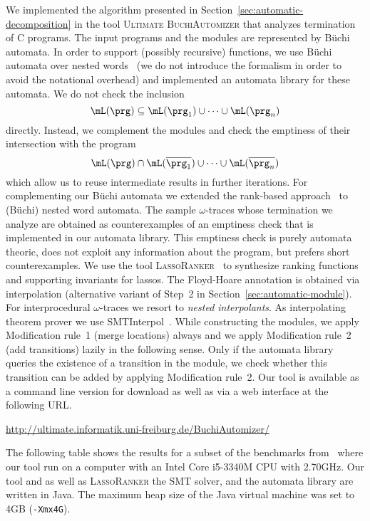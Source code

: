 We implemented the algorithm presented in Section~\ref{sec:automatic-decomposition} in the tool \textsc{Ultimate BuchiAutomizer} that analyzes termination of C programs.
The input programs and the modules are represented by Büchi automata. In order to support (possibly recursive) functions, we use Büchi automata over nested words~\cite{journals/jacm/AlurM09} (we do not introduce the formalism in order to avoid the notational overhead) and implemented an automata library for these automata.
We do not check the inclusion 
\[\mL(\prg) \subseteq \mL(\prg_1)\cup\dots\cup \mL(\prg_n)\]
directly. Instead, we complement the modules and check the emptiness of their intersection with the program 
\[\mL(\prg) \cap \mL(\overline{\prg_1})\cup\dots\cup \mL(\overline{\prg_n})\]
which allow us to reuse intermediate results in further iterations. For complementing our Büchi automata we extended\cite{wu:11} the rank-based approach~\cite{conf/atva/FriedgutKV04} to (Büchi) nested word automata. The sample $\omega$-traces whose termination we analyze are obtained as counterexamples of an emptiness check that is implemented in our automata library. This emptiness check is purely automata theoric, does not exploit any information about the program, but prefers short counterexamples.
We use the tool \textsc{LassoRanker}~\cite{conf/atva/HeizmannHLP13,conf/tacas/LeikeH14} to synthesize ranking functions and supporting invariants for lassos. 
The Floyd-Hoare annotation is obtained via interpolation (alternative variant of Step~2 in Section~\ref{sec:automatic-module}).
For interprocedural $\omega$-traces we resort to \emph{nested interpolants}\cite{conf/popl/HeizmannHP10}. 
As interpolating theorem prover we use SMTInterpol~\cite{conf/spin/ChristHN12}. 
While constructing the modules, we apply Modification rule~1 (merge locations) always and we apply Modification rule~2 (add transitions) lazily in the following sense. Only if the automata library queries the existence of a transition in the module, we check whether this transition can be added by applying Modification rule~2.
Our tool is available as a command line version for download as well as via a web interface at the following URL.
\begin{center}
\url{http://ultimate.informatik.uni-freiburg.de/BuchiAutomizer/}
\end{center}

The following table shows the results for a subset of the benchmarks from~\cite{conf/cav/BrockschmidtCF13} where our tool run on a computer with an Intel Core i5-3340M CPU with 2.70GHz. Our tool and as well as \textsc{LassoRanker} the SMT solver, and the automata library are written in Java. The maximum heap size of the Java virtual machine was set to 4GB (\texttt{-Xmx4G}). 

